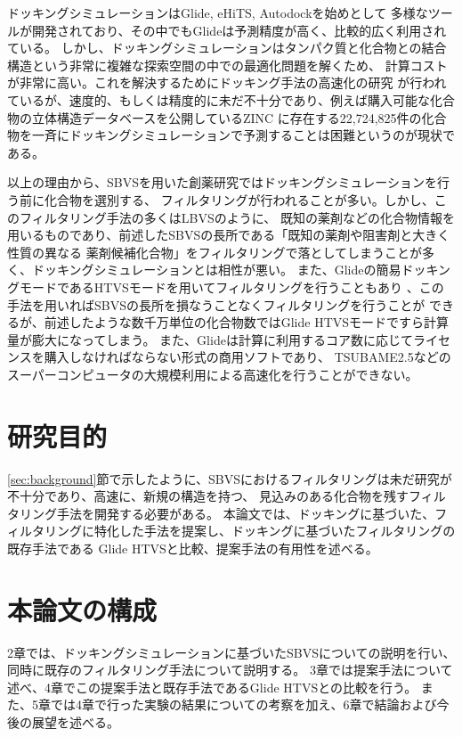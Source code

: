 ドッキングシミュレーションはGlide\cite{Friesner2004}, eHiTS\cite{Zsoldos2007}, Autodock\cite{Morris2009}を始めとして
多様なツールが開発されており、その中でもGlideは予測精度が高く、比較的広く利用されている。
しかし、ドッキングシミュレーションはタンパク質と化合物との結合構造という非常に複雑な探索空間の中での最適化問題を解くため、
計算コストが非常に高い。これを解決するためにドッキング手法の高速化の研究\cite{Kannan2010, McIntosh-Smith2014, Trott2010}
が行われているが、速度的、もしくは精度的に未だ不十分であり、例えば購入可能な化合物の立体構造データベースを公開しているZINC
\cite{Irwin2005}に存在する22,724,825件の化合物を一斉にドッキングシミュレーションで予測することは困難というのが現状である。

以上の理由から、SBVSを用いた創薬研究ではドッキングシミュレーションを行う前に化合物を選別する、
フィルタリングが行われることが多い\cite{Nilakantan1993, Parenti2003}。しかし、このフィルタリング手法の多くはLBVSのように、
既知の薬剤などの化合物情報を用いるものであり、前述したSBVSの長所である「既知の薬剤や阻害剤と大きく性質の異なる
薬剤候補化合物」をフィルタリングで落としてしまうことが多く、ドッキングシミュレーションとは相性が悪い。
また、Glideの簡易ドッキングモードであるHTVSモードを用いてフィルタリングを行うこともあり
\cite{Fujimoto2008}、この手法を用いればSBVSの長所を損なうことなくフィルタリングを行うことが
できるが、前述したような数千万単位の化合物数ではGlide HTVSモードですら計算量が膨大になってしまう。
また、Glideは計算に利用するコア数に応じてライセンスを購入しなければならない形式の商用ソフトであり、
TSUBAME2.5などのスーパーコンピュータの大規模利用による高速化を行うことができない。

\section{研究目的}
\ref{sec:background}節で示したように、SBVSにおけるフィルタリングは未だ研究が不十分であり、高速に、新規の構造を持つ、
見込みのある化合物を残すフィルタリング手法を開発する必要がある。
本論文では、ドッキングに基づいた、フィルタリングに特化した手法を提案し、ドッキングに基づいたフィルタリングの既存手法である
Glide HTVSと比較、提案手法の有用性を述べる。

\section{本論文の構成}
2章では、ドッキングシミュレーションに基づいたSBVSについての説明を行い、同時に既存のフィルタリング手法について説明する。
3章では提案手法について述べ、4章でこの提案手法と既存手法であるGlide HTVSとの比較を行う。
また、5章では4章で行った実験の結果についての考察を加え、6章で結論および今後の展望を述べる。